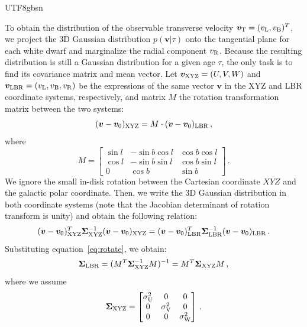 \documentclass[twocolumn, times, trackchanges]{aastex63_bren}
\newcommand{\vL}{v_{\rm L}}
\newcommand{\vB}{v_{\rm B}}
\newcommand{\mathbfit}{\bm}
\newcommand{\bvT}{\mathbfit{v}_{\rm T}}
\begin{document}
\begin{CJK*}{UTF8}{gbsn}
\begin{appendix}
To obtain the distribution of the observable transverse velocity $\bvT=(\vL,\vB)^T$, we project the 3D Gaussian distribution $p(\mathbfit{v}|\tau)$ onto the tangential plane for each white dwarf and marginalize the radial component $v_{\rm R}$. Because the resulting distribution is still a Gaussian distribution for a given age $\tau$, the only task is to find its covariance matrix and mean vector. Let $\bm{v}_{\rm XYZ}=(U,V,W)$ and $\bm{v}_{\rm \rm LBR}=(v_{\rm L},v_{\rm B},v_{\rm R})$ be the expressions of the same vector $\bm{v}$ in the XYZ and LBR coordinate systems, respectively, and matrix $M$ the rotation transformation matrix between the two systems:
\begin{equation}
\label{eq:rotate}
    (\bm{v}-\bm{v}_{0})_{\rm XYZ}=M\cdot (\bm{v}-\bm{v}_{0})_{\rm LBR}\,,
\end{equation}
where
\begin{equation}
    M=\begin{bmatrix} 
    \sin l&-\sin b\cos l&\cos b \cos l\\
    \cos l&-\sin b \sin l&\cos b \sin l\\
    0&\cos b&\sin b
    \end{bmatrix}\,.
\end{equation}
We ignore the small in-disk rotation between the Cartesian coordinate $XYZ$ and the galactic polar coordinate. Then, we write the 3D Gaussian distribution in both coordinate systems (note that the Jacobian determinant of rotation transform is unity) and obtain the following relation:
\begin{equation}
    (\bm{v}-\bm{v}_{0})_{\rm XYZ}^T\mathbf{\Sigma}_{\rm XYZ}^{-1}(\bm{v}-\bm{v}_{0})_{\rm XYZ}=(\bm{v}-\bm{v}_{0})_{\rm LBR}^T\mathbf{\Sigma}_{\rm LBR}^{-1}(\bm{v}-\bm{v}_{0})_{\rm LBR}\,.
\end{equation}
Substituting equation~\ref{eq:rotate}, we obtain:
\begin{equation}
\label{eq:rotate 3d-gaussian}
    \mathbf{\Sigma}_{\rm LBR}=(M^T\mathbf{\Sigma}_{\rm XYZ}^{-1}M)^{-1}=M^T\mathbf{\Sigma}_{\rm XYZ}M\,,
\end{equation}
where we assume
\begin{equation}
\mathbf{\Sigma}_{\rm XYZ}=\begin{bmatrix}
    \sigma_{\rm U}^2&0&0\\
    0&\sigma_{\rm V}^2 & 0\\
    0&0&\sigma_{\rm W}^2
\end{bmatrix}\,.
\end{equation}

\end{appendix}
\end{CJK*}
\end{document}
